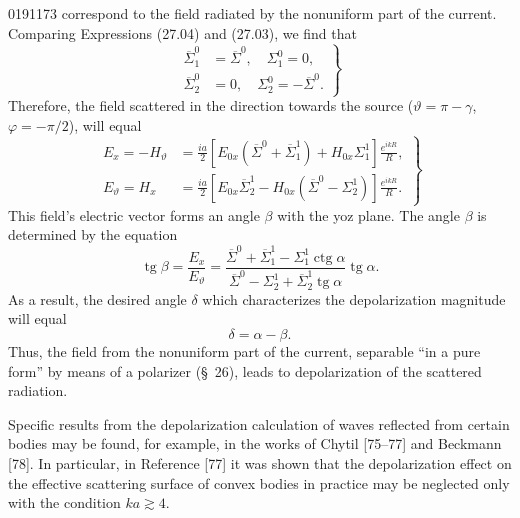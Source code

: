 \begin{scanpage}{0191}{173}
correspond to the field radiated by the nonuniform part of the current. Comparing Expressions (27.04) and (27.03), we find that
\[
\left.\begin{aligned}\overline\Sigma_1^0&=\overline\Sigma^0,\quad\Sigma_1^0=0,\\
\overline\Sigma_2^0&=0,\quad\Sigma_2^0=-\overline\Sigma^0.
\end{aligned}\right\}\tag{27.07}
\]
Therefore, the field scattered in the direction towards the source ($\vartheta=\pi-\gamma$, $\varphi=-\pi/2$), will equal
\[
\left.\begin{aligned}E_x=-H_\vartheta&=\frac{ia}2[E_{0x}(\overline\Sigma^0+\overline\Sigma_1^1)+H_{0x}\Sigma_1^1]\frac{e^{ikR}}R,\\
E_\vartheta=H_x&=\frac{ia}2[E_{0x}\overline\Sigma_2^1-H_{0x}(\overline\Sigma^0-\Sigma_2^1)]\frac{e^{ikR}}R.
\end{aligned}\right\}\tag{27.08}
\]
This field's electric vector forms an angle $\beta$ with the yoz plane. The angle $\beta$ is determined by the equation
\[
\operatorname{tg}\beta=\frac{E_x}{E_\vartheta}=\frac{\overline\Sigma^0+\overline\Sigma_1^1-\Sigma_1^1\operatorname{ctg}\alpha}{\overline\Sigma^0-\Sigma_2^1+\overline\Sigma_2^1\operatorname{tg}\alpha}\operatorname{tg}\alpha.\tag{27.09}
\]
As a result, the desired angle $\delta$ which characterizes the depolarization magnitude will equal
\[
\delta=\alpha-\beta.\tag{27.10}
\]
Thus, the field from the nonuniform part of the current, separable ``in a pure form'' by means of a polarizer (\S~26), leads to depolarization of the scattered radiation.

Specific results from the depolarization calculation of waves reflected from certain bodies may be found, for example, in the works of Chytil [75--77] and Beckmann [78]. In particular, in Reference [77] it was shown that the depolarization effect on the effective scattering surface of convex bodies in practice may be neglected only with the condition $ka\gtrsim4$.
\end{scanpage}
